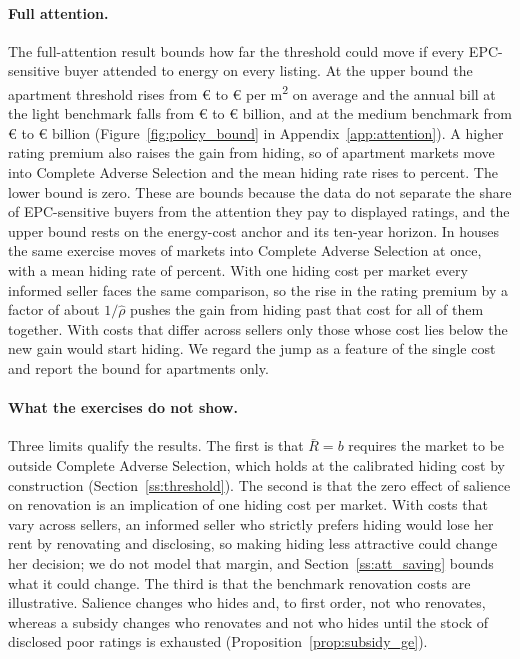 \documentclass[10pt,letterpaper]{bp-template-concise}
\begin{document}
\paragraph{Full attention.}
The full-attention result bounds how far the threshold could move if every EPC-sensitive buyer attended to energy on every listing. At the upper bound the apartment threshold rises from \euro{}\attScBaseRbarApt{} to \euro{}\attScHiRbarApt{} per m\textsuperscript{2} on average and the annual bill at the light benchmark falls from \euro{}\attScBaseCostTwoFiftyApt{} to \euro{}\attScHiCostTwoFiftyApt{} billion, and at the medium benchmark from \euro{}\attScBaseCostFiveHundredApt{} to \euro{}\attScHiCostFiveHundredApt{} billion (Figure~\ref{fig:policy_bound} in Appendix~\ref{app:attention}). A higher rating premium also raises the gain from hiding, so \attScHiNCasApt{} of \attNMarketsApt{} apartment markets move into Complete Adverse Selection and the mean hiding rate rises to \attScHiSigmaApt{} percent. The lower bound is zero. These are bounds because the data do not separate the share of EPC-sensitive buyers from the attention they pay to displayed ratings, and the upper bound rests on the energy-cost anchor and its ten-year horizon. In houses the same exercise moves \attScHiNCasHouse{} of \attNMarketsHouse{} markets into Complete Adverse Selection at once, with a mean hiding rate of \attScHiSigmaHouse{} percent. With one hiding cost per market every informed seller faces the same comparison, so the rise in the rating premium by a factor of about $1/\hat\rho$ pushes the gain from hiding past that cost for all of them together. With costs that differ across sellers only those whose cost lies below the new gain would start hiding. We regard the jump as a feature of the single cost and report the bound for apartments only.

\paragraph{What the exercises do not show.}
Three limits qualify the results. The first is that $\bar R=b$ requires the market to be outside Complete Adverse Selection, which holds at the calibrated hiding cost by construction (Section~\ref{ss:threshold}). The second is that the zero effect of salience on renovation is an implication of one hiding cost per market. With costs that vary across sellers, an informed seller who strictly prefers hiding would lose her rent by renovating and disclosing, so making hiding less attractive could change her decision; we do not model that margin, and Section~\ref{ss:att_saving} bounds what it could change. The third is that the benchmark renovation costs are illustrative. Salience changes who hides and, to first order, not who renovates, whereas a subsidy changes who renovates and not who hides until the stock of disclosed poor ratings is exhausted (Proposition~\ref{prop:subsidy_ge}).
\end{document}
